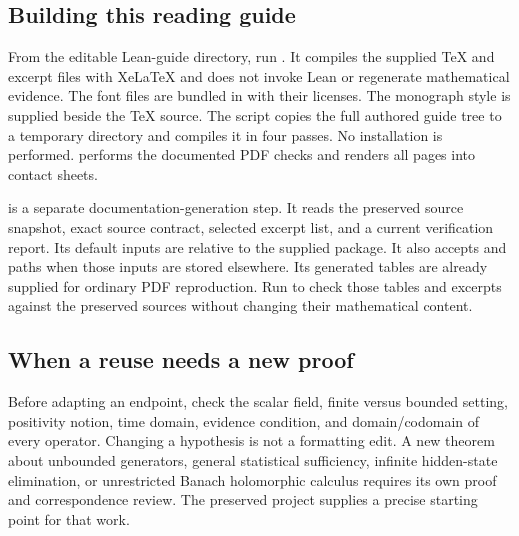\subsection{Building this reading guide}
From the editable Lean-guide directory, run . It compiles the supplied TeX and excerpt files with XeLaTeX and does not invoke Lean or regenerate mathematical evidence. The font files are bundled in  with their licenses. The monograph style is supplied beside the TeX source. The script copies the full authored guide tree to a temporary directory and compiles it in four passes. No installation is performed.  performs the documented PDF checks and renders all pages into contact sheets.

 is a separate documentation-generation step. It reads the preserved source snapshot, exact source contract, selected excerpt list, and a current verification report. Its default inputs are relative to the supplied package. It also accepts  and  paths when those inputs are stored elsewhere. Its generated tables are already supplied for ordinary PDF reproduction. Run  to check those tables and excerpts against the preserved sources without changing their mathematical content.

\subsection{When a reuse needs a new proof}
Before adapting an endpoint, check the scalar field, finite versus bounded setting, positivity notion, time domain, evidence condition, and domain/codomain of every operator. Changing a hypothesis is not a formatting edit. A new theorem about unbounded generators, general statistical sufficiency, infinite hidden-state elimination, or unrestricted Banach holomorphic calculus requires its own proof and correspondence review. The preserved project supplies a precise starting point for that work.
